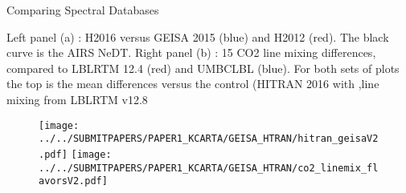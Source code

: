 \documentclass[10pt,t]{beamer}
\begin{document}
\begin{frame}{Comparing Spectral Databases}

\begin{block}{}
 Left panel (a) : H2016 versus GEISA 2015 (blue) and H2012
  (red). The black curve is the AIRS NeDT. Right panel (b) : 15 \um CO2
  line mixing differences, compared to LBLRTM 12.4 (red) and UMBCLBL
  (blue). For both sets of plots the top is the mean differences
  versus the control (HITRAN 2016 with \cd,\methane line mixing from LBLRTM v12.8
\begin{figure}
\begin{center}
\texttt{[image: ../../SUBMITPAPERS/PAPER1\_KCARTA/GEISA\_HTRAN/hitran\_geisaV2.pdf]}
\texttt{[image: ../../SUBMITPAPERS/PAPER1\_KCARTA/GEISA\_HTRAN/co2\_linemix\_flavorsV2.pdf]}
\end{center}
\end{figure}
\end{block}
\end{frame}

\end{document}
